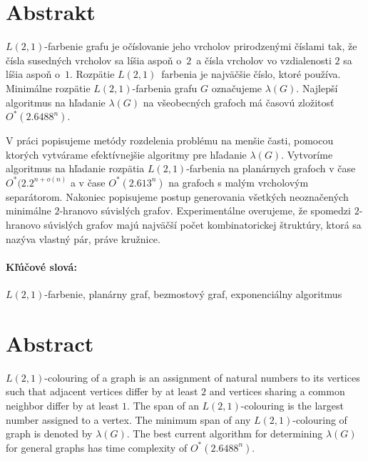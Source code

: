 \documentclass[12pt, oneside]{book}
\begin{document}

\newpage 
\section*{Abstrakt}

$L(2,1)$-farbenie grafu je očíslovanie jeho vrcholov prirodzenými číslami tak,
že čísla susedných vrcholov sa líšia aspoň o $2$ a čísla vrcholov vo vzdialenosti
$2$ sa líšia aspoň o $1$. Rozpätie $L(2,1)$ farbenia je najväčšie číslo, ktoré
používa. Minimálne rozpätie $L(2,1)$-farbenia grafu $G$ označujeme $\lambda(G)$.
Najlepší algoritmus na hľadanie $\lambda(G)$ na všeobecných grafoch má
časovú zložitosť $O^*(2.6488^n)$.

V práci popisujeme metódy rozdelenia problému na menšie časti, pomocou
ktorých vytvárame efektívnejšie algoritmy pre hľadanie $\lambda(G)$.
Vytvoríme algoritmus na hľadanie rozpätia $L(2,1)$-farbenia na planárnych
grafoch v čase $O^*(2.2^{n + o(n)}$ a v čase $O^*(2.613^n)$ na grafoch s malým
vrcholovým separátorom. Nakoniec popisujeme postup generovania všetkých neoznačených
minimálne $2$-hranovo súvislých grafov. Experimentálne overujeme, že spomedzi $2$-hranovo
súvislých grafov majú najväčší počet kombinatorickej štruktúry, ktorá sa
nazýva vlastný pár, práve kružnice.

\paragraph*{Kľúčové slová:} $L(2,1)$-farbenie, planárny graf, bezmostový graf, exponenciálny algoritmus



\newpage 
\section*{Abstract}

$L(2,1)$-colouring of a graph is an assignment of natural numbers to its vertices such
that adjacent vertices differ by at least $2$ and vertices sharing a common neighbor
differ by at least $1$. The span of an $L(2,1)$-colouring is the largest number assigned
to a vertex. The minimum span of any $L(2,1)$-colouring of graph is denoted by $\lambda(G)$.
The best current algorithm for determining $\lambda(G)$ for general graphs has
time complexity of $O^*(2.6488^n)$.
\end{document}
